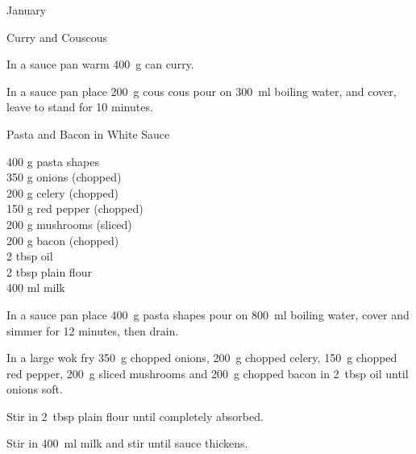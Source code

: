 \begin{menu}{January}
\begin{recipe}{1}{Curry and Couscous}
\begin{ingredients}
		\end{ingredients}
	
    \begin{instructions}
    \item 
        In a sauce pan warm
        400~g  can curry.
      \item 
      In a
      sauce pan 
      place
      200~g  cous cous
      pour on
      300~ml  boiling water,
      and cover, leave to stand for 10 minutes.
    
    \end{instructions}
    \end{recipe}%
  
    \begin{recipe}{2}{Pasta and Bacon in White Sauce}%
		\begin{ingredients}
		400 g pasta shapes  \\
	350 g onions (chopped) \\
	200 g celery (chopped) \\
	150 g red pepper (chopped) \\
	200 g mushrooms (sliced) \\
	200 g bacon (chopped) \\
	2 tbsp oil  \\
	2 tbsp plain flour  \\
	400 ml milk  \\
	
		\end{ingredients}
	
    \begin{instructions}
    \item 
      In a
      sauce pan
      place
      400~g  pasta shapes
      pour on
      800~ml  boiling water,
      cover and simmer for 12 minutes, then drain.
    \item 
        In a large wok fry
        350~g chopped onions,
        200~g chopped celery,
        150~g chopped red pepper,
        200~g sliced mushrooms
        and
        200~g chopped bacon
        in
        2~tbsp  oil
        until onions soft.
      \item 
        Stir in
        2~tbsp  plain flour
        until completely absorbed.
      \item 
        Stir in
        400~ml  milk
        and stir
        until sauce thickens.
      
    \end{instructions}
    \end{recipe}%
  

\end{menu}
